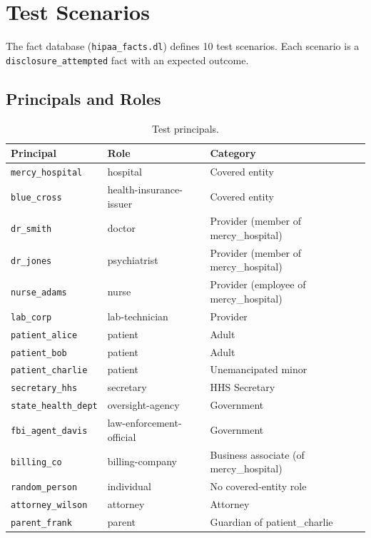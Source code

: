 \documentclass[11pt,letterpaper]{article}
\begin{document}
\section{Test Scenarios}
\label{sec:tests}

The fact database (\texttt{hipaa\_facts.dl}) defines 10 test scenarios. Each scenario is a \texttt{disclosure\_attempted} fact with an expected outcome.

\subsection{Principals and Roles}

\begin{table}[H]
\centering
\begin{tabular}{lll}
\toprule
\textbf{Principal} & \textbf{Role} & \textbf{Category} \\
\midrule
\texttt{mercy\_hospital} & hospital & Covered entity \\
\texttt{blue\_cross} & health-insurance-issuer & Covered entity \\
\texttt{dr\_smith} & doctor & Provider (member of mercy\_hospital) \\
\texttt{dr\_jones} & psychiatrist & Provider (member of mercy\_hospital) \\
\texttt{nurse\_adams} & nurse & Provider (employee of mercy\_hospital) \\
\texttt{lab\_corp} & lab-technician & Provider \\
\texttt{patient\_alice} & patient & Adult \\
\texttt{patient\_bob} & patient & Adult \\
\texttt{patient\_charlie} & patient & Unemancipated minor \\
\texttt{secretary\_hhs} & secretary & HHS Secretary \\
\texttt{state\_health\_dept} & oversight-agency & Government \\
\texttt{fbi\_agent\_davis} & law-enforcement-official & Government \\
\texttt{billing\_co} & billing-company & Business associate (of mercy\_hospital) \\
\texttt{random\_person} & individual & No covered-entity role \\
\texttt{attorney\_wilson} & attorney & Attorney \\
\texttt{parent\_frank} & parent & Guardian of patient\_charlie \\
\bottomrule
\end{tabular}
\caption{Test principals.}
\end{table}
\end{document}
